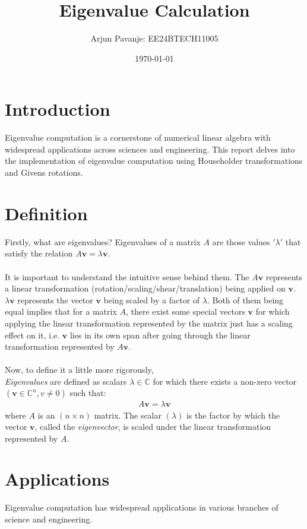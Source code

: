 \documentclass[12pt]{article}
\title{Eigenvalue Calculation}
\author{Arjun Pavanje: EE24BTECH11005}
\date{\today}
\begin{document}
\maketitle

\section{Introduction}


Eigenvalue computation is a cornerstone of numerical linear algebra with widespread applications across sciences and engineering. This report delves into the implementation of eigenvalue computation using Householder transformations and Givens rotations. 
\section{Definition}
Firstly, what are eigenvalues? Eigenvalues of a matrix $A$ are those values $'\lambda'$ that satisfy the relation $A\mathbf{v}=\lambda\mathbf{v}$.\\\\
It is important to understand the intuitive sense behind them. The $A\mathbf{v}$ represents a linear transformation (rotation/scaling/shear/translation) being applied on $\mathbf{v}$. $\lambda\mathbf{v}$ represents the vector $\mathbf{v}$ being scaled by a factor of $\lambda$. Both of them being equal implies that for a matrix $A$, there exist some special vectors $\mathbf{v}$ for which applying the linear transformation represented by the matrix just has a scaling effect on it, i.e. $\mathbf{v}$ lies in its own span after going through the linear transformation represented by $A\mathbf{v}$.\\\\

Now, to define it a little more rigorously,\\ 
\textit{Eigenvalues} are defined as scalars \( \lambda \in \mathbb{C} \) for which there exists a non-zero vector $( \mathbf{v} \in \mathbb{C}^n, v \ne 0)$ such that:
\begin{align*}
A \mathbf{v} = \lambda \mathbf{v}
\end{align*}
where $ A $ is an $(n \times n)$ matrix. The scalar $(\lambda)$ is the factor by which the vector $\mathbf{v}$, called the \textit{eigenvector}, is scaled under the linear transformation represented by \( A \).


\section{Applications}
Eigenvalue computation has widespread applications in various branches of science and engineering.
\end{document}
